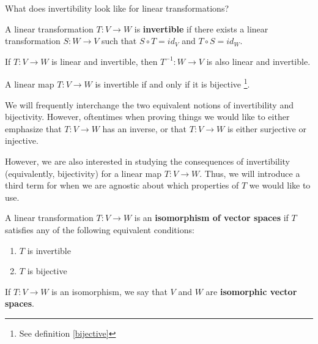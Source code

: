 

\begin{motivating}
What does invertibility look like for linear transformations?
\end{motivating}

\begin{definition}
    A linear transformation $T: V \to W$ is \textbf{invertible} if there exists a linear transformation $S : W \to V$ such that $S \circ T = id_V$ and $T \circ S = id_W$.
    \end{definition}


\begin{proposition}
    If $T : V \to W$ is linear and invertible, then $T^{-1} : W \to V$ is also linear and invertible.
    \end{proposition}

\begin{proposition}
    A linear map $T : V \to W$ is invertible if and only if it is bijective \footnote{See definition \ref{bijective}}.  
\end{proposition}
    
    We will frequently interchange the two equivalent notions of invertibility and bijectivity.  However, oftentimes when proving things we would like to either emphasize that $T : V \to W$ has an inverse, or that $T: V \to W$ is either surjective or injective.

    However, we are also interested in studying the consequences of invertibility (equivalently, bijectivity) for a linear map $T: V \to W$.  Thus, we will introduce a third term for when we are agnostic about which properties of $T$ we would like to use.
    
    \begin{definition}\label{isomorphism}
    A linear transformation $T: V \to W$ is an \textbf{isomorphism of vector spaces} if $T$ satisfies any of the following equivalent conditions:

    \begin{enumerate}
        \item $T$ is invertible
        \item $T$ is bijective
    \end{enumerate}

    If $T : V \to W$ is an isomorphism, we say that $V$ and $W$ are \textbf{isomorphic vector spaces}.
\end{definition}



